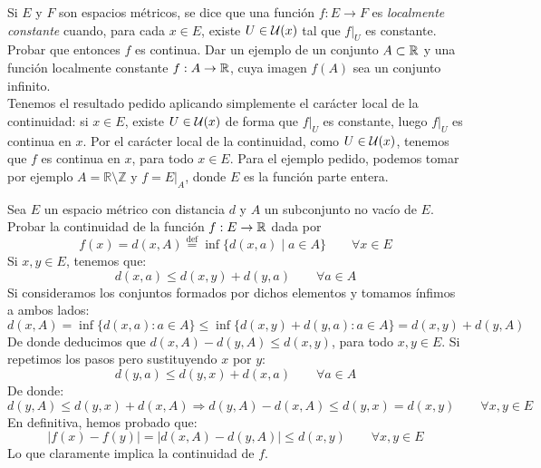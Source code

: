\begin{ejercicio}
    Si $E$ y $F$ son espacios métricos, se dice que una función $f:E\to F$ es \emph{localmente constante} cuando, para cada $x\in E$, existe $U \in \mathcal{U}(x)$ tal que $f\big|_{U}$ es constante. Probar que entonces $f$ es continua. Dar un ejemplo de un conjunto $A \subset \mathbb{R}$ y una función localmente
    constante $f : A\to \mathbb{R}$, cuya imagen $f(A)$ sea un conjunto infinito.\\

    \noindent
    Tenemos el resultado pedido aplicando simplemente el carácter local de la continuidad: si $x\in E$, existe $U\in \mathcal{U}(x)$ de forma que $f\big|_{U}$ es constante, luego $f\big|_{U}$ es continua en $x$. Por el carácter local de la continuidad, como $U\in \mathcal{U}(x)$, tenemos que $f$ es continua en $x$, para todo $x\in E$. Para el ejemplo pedido, podemos tomar por ejemplo $A = \mathbb{R}\setminus \mathbb{Z}$ y $f = E\big|_{A}$, donde $E$ es la función parte entera.
\end{ejercicio}

\begin{ejercicio}\label{ej:rel3_4}
    Sea $E$ un espacio métrico con distancia $d$ y $A$ un subconjunto no vacío de $E$. Probar la continuidad de la función $f : E \to \mathbb{R}$ dada por
    \begin{equation*}
        f(x)=d(x,A)\stackrel{\text{def}}{=}\inf\{d(x,a)\mid a \in A\} \qquad \forall x\in E
    \end{equation*}
    Si $x,y\in E$, tenemos que:
    \begin{equation*}
        d(x,a) \leq d(x,y) + d(y,a) \qquad \forall a\in A
    \end{equation*}
    Si consideramos los conjuntos formados por dichos elementos y tomamos ínfimos a ambos lados:
    \begin{equation*}
        d(x,A) = \inf\{d(x,a):a\in A\} \leq \inf\{d(x,y)+d(y,a):a\in A\} = d(x,y)+d(y,A)
    \end{equation*}
    De donde deducimos que $d(x,A) - d(y,A) \leq d(x,y)$, para todo $x,y\in E$. Si repetimos los pasos pero sustituyendo $x$ por $y$:
    \begin{equation*}
        d(y,a) \leq d(y,x) + d(x,a) \qquad \forall a\in A
    \end{equation*}
    De donde:
    \begin{equation*}
        d(y,A) \leq d(y,x) + d(x,A) \Longrightarrow d(y,A) - d(x,A) \leq d(y,x) = d(x,y) \qquad \forall x,y\in E
    \end{equation*}
    En definitiva, hemos probado que:
    \begin{equation*}
        |f(x) - f(y)| = \left|d(x,A)-d(y,A)\right| \leq d(x,y) \qquad \forall x,y\in E
    \end{equation*}
    Lo que claramente implica la continuidad de $f$.
\end{ejercicio}

